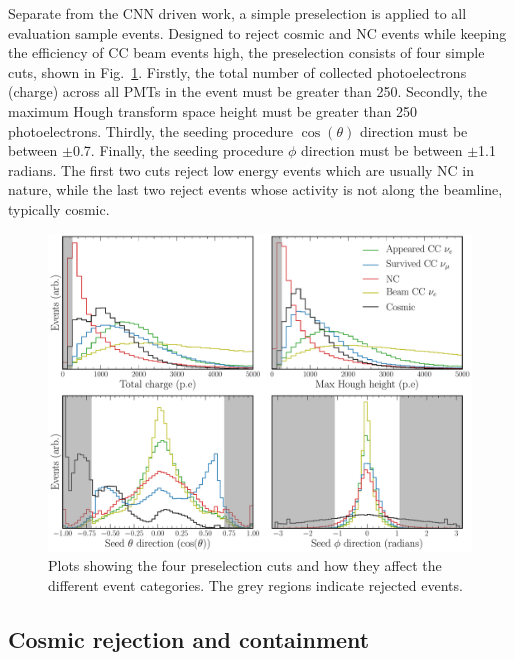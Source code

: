 Separate from the CNN driven work, a simple preselection is applied to all evaluation sample
events. Designed to reject cosmic and NC events while keeping the efficiency of CC beam events
high, the preselection consists of four simple cuts, shown in Fig.~\ref{fig:explore_simple_cuts}.
Firstly, the total number of collected photoelectrons (charge) across all PMTs in the event must
be greater than 250. Secondly, the maximum Hough transform space height must be greater than 250
photoelectrons. Thirdly, the seeding procedure $\cos(\theta)$ direction must be between $\pm$0.7.
Finally, the seeding procedure $\phi$ direction must be between $\pm$1.1 radians. The first two
cuts reject low energy events which are usually NC in nature, while the last two reject events
whose activity is not along the beamline, typically cosmic.

\begin{figure} %
    \includegraphics[width=\textwidth]{diagrams/7-results/explore_simple_cuts.pdf}
    \caption[Plots detailing evaluation sample preselection cuts]
    {Plots showing the four preselection cuts and how they affect the different event categories.
        The grey regions indicate rejected events.}
    \label{fig:explore_simple_cuts}
\end{figure}

\subsection{Cosmic rejection and containment} %
\label{sec:results_eval_cosmic} %

